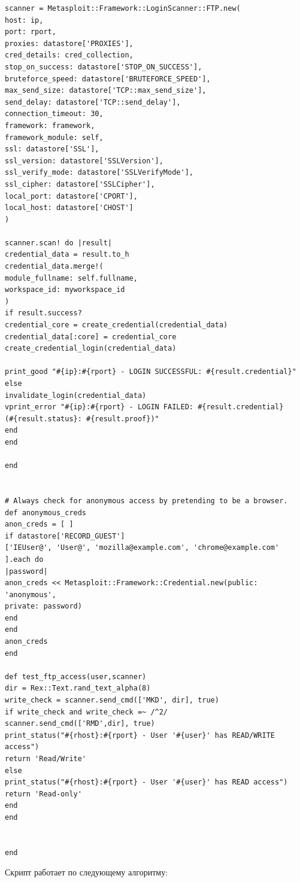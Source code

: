 \documentclass[10pt,a4paper]{report}
\begin{document}
\begin{lstlisting}
scanner = Metasploit::Framework::LoginScanner::FTP.new(
host: ip,
port: rport,
proxies: datastore['PROXIES'],
cred_details: cred_collection,
stop_on_success: datastore['STOP_ON_SUCCESS'],
bruteforce_speed: datastore['BRUTEFORCE_SPEED'],
max_send_size: datastore['TCP::max_send_size'],
send_delay: datastore['TCP::send_delay'],
connection_timeout: 30,
framework: framework,
framework_module: self,
ssl: datastore['SSL'],
ssl_version: datastore['SSLVersion'],
ssl_verify_mode: datastore['SSLVerifyMode'],
ssl_cipher: datastore['SSLCipher'],
local_port: datastore['CPORT'],
local_host: datastore['CHOST']
)

scanner.scan! do |result|
credential_data = result.to_h
credential_data.merge!(
module_fullname: self.fullname,
workspace_id: myworkspace_id
)
if result.success?
credential_core = create_credential(credential_data)
credential_data[:core] = credential_core
create_credential_login(credential_data)

print_good "#{ip}:#{rport} - LOGIN SUCCESSFUL: #{result.credential}"
else
invalidate_login(credential_data)
vprint_error "#{ip}:#{rport} - LOGIN FAILED: #{result.credential} 
(#{result.status}: #{result.proof})"
end
end

end


# Always check for anonymous access by pretending to be a browser.
def anonymous_creds
anon_creds = [ ]
if datastore['RECORD_GUEST']
['IEUser@', 'User@', 'mozilla@example.com', 'chrome@example.com' ].each do 
|password|
anon_creds << Metasploit::Framework::Credential.new(public: 'anonymous', 
private: password)
end
end
anon_creds
end

def test_ftp_access(user,scanner)
dir = Rex::Text.rand_text_alpha(8)
write_check = scanner.send_cmd(['MKD', dir], true)
if write_check and write_check =~ /^2/
scanner.send_cmd(['RMD',dir], true)
print_status("#{rhost}:#{rport} - User '#{user}' has READ/WRITE access")
return 'Read/Write'
else
print_status("#{rhost}:#{rport} - User '#{user}' has READ access")
return 'Read-only'
end
end


end
		\end{lstlisting}
		Скрипт работает по следующему алгоритму:
\end{document}
